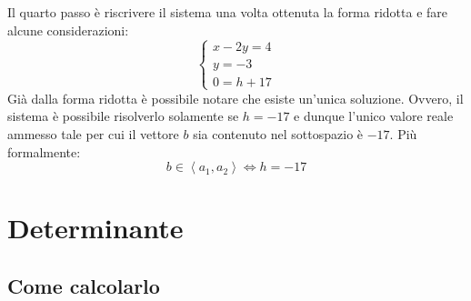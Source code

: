 \documentclass[a4paper]{article}
\begin{document}
	Il \textcolor{Red3}{quarto passo} è riscrivere il sistema una volta ottenuta la forma ridotta e fare alcune considerazioni:
	\begin{equation*}
		\begin{cases}
			x - 2y = 4  \\
			y = -3		\\
			0 = h + 17
		\end{cases}
	\end{equation*}
	Già dalla forma ridotta è possibile notare che esiste un'unica soluzione. Ovvero, il sistema è possibile risolverlo solamente se $h = -17$ e dunque l'unico valore reale ammesso tale per cui il vettore $b$ sia contenuto nel sottospazio è $-17$. Più formalmente:
	\begin{equation*}
		b \in \left\langle a_{1}, a_{2} \right\rangle \iff h = -17
	\end{equation*}\newpage

	\section{Determinante}
	
	\subsection{Come calcolarlo}\label{Determinante}
	
\end{document}
